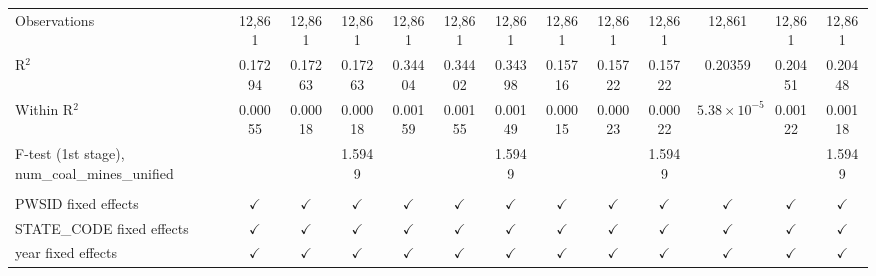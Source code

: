 \begin{table}[htbp]
\begin{adjustbox}{width = \textwidth, center}
\begin{tabular}{lcccccccccccc}
          \\
         Observations                                     & 12,861        & 12,861                & 12,861        & 12,861        & 12,861        & 12,861        & 12,861        & 12,861        & 12,861        & 12,861                & 12,861         & 12,861\\  
         R$^2$                                            & 0.17294       & 0.17263               & 0.17263       & 0.34404       & 0.34402       & 0.34398       & 0.15716       & 0.15722       & 0.15722       & 0.20359               & 0.20451        & 0.20448\\  
         Within R$^2$                                     & 0.00055       & 0.00018               & 0.00018       & 0.00159       & 0.00155       & 0.00149       & 0.00015       & 0.00023       & 0.00022       & $5.38\times 10^{-5}$  & 0.00122        & 0.00118\\  
         F-test (1st stage), num\_coal\_mines\_unified    &               &                       & 1.5949        &               &               & 1.5949        &               &               & 1.5949        &                       &                & 1.5949\\  
          \\
         PWSID fixed effects                              & $\checkmark$  & $\checkmark$          & $\checkmark$  & $\checkmark$  & $\checkmark$  & $\checkmark$  & $\checkmark$  & $\checkmark$  & $\checkmark$  & $\checkmark$          & $\checkmark$   & $\checkmark$\\   
         STATE\_CODE fixed effects                        & $\checkmark$  & $\checkmark$          & $\checkmark$  & $\checkmark$  & $\checkmark$  & $\checkmark$  & $\checkmark$  & $\checkmark$  & $\checkmark$  & $\checkmark$          & $\checkmark$   & $\checkmark$\\   
         year fixed effects                               & $\checkmark$  & $\checkmark$          & $\checkmark$  & $\checkmark$  & $\checkmark$  & $\checkmark$  & $\checkmark$  & $\checkmark$  & $\checkmark$  & $\checkmark$          & $\checkmark$   & $\checkmark$\\   
         \bottomrule
      \end{tabular}
   \end{adjustbox}
\end{table}


